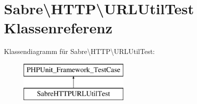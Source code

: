 \hypertarget{class_sabre_1_1_h_t_t_p_1_1_u_r_l_util_test}{}\section{Sabre\textbackslash{}H\+T\+TP\textbackslash{}U\+R\+L\+Util\+Test Klassenreferenz}
\label{class_sabre_1_1_h_t_t_p_1_1_u_r_l_util_test}
Klassendiagramm für Sabre\textbackslash{}H\+T\+TP\textbackslash{}U\+R\+L\+Util\+Test\+:\begin{figure}[H]
\begin{center}
\leavevmode
\includegraphics[height=2.000000cm]{class_sabre_1_1_h_t_t_p_1_1_u_r_l_util_test}
\end{center}
\end{figure}
